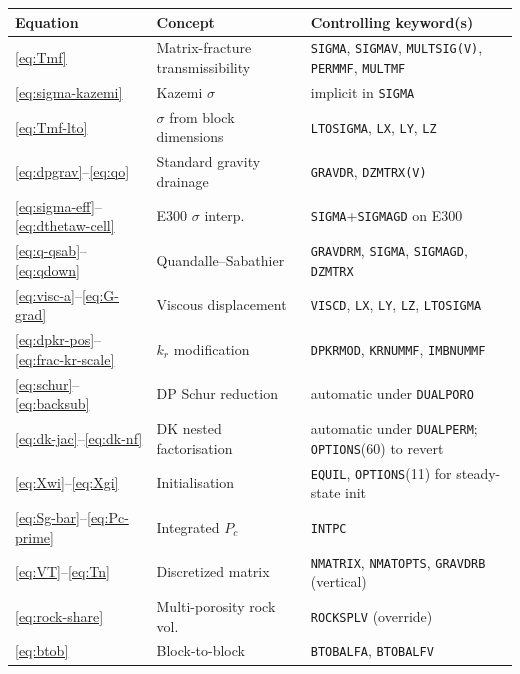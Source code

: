 \documentclass[11pt,a4paper]{article}
\newcommand{\kw}[1]{\texttt{#1}}
\begin{document}
\begin{center}\small
\begin{tabular}{lll}
\toprule
Equation & Concept & Controlling keyword(s) \\
\midrule
\eqref{eq:Tmf}            & Matrix-fracture transmissibility            & \kw{SIGMA}, \kw{SIGMAV}, \kw{MULTSIG(V)}, \kw{PERMMF}, \kw{MULTMF}  \\
\eqref{eq:sigma-kazemi}   & Kazemi $\sigma$                              & implicit in \kw{SIGMA}                 \\
\eqref{eq:Tmf-lto}        & $\sigma$ from block dimensions               & \kw{LTOSIGMA}, \kw{LX}, \kw{LY}, \kw{LZ} \\
\eqref{eq:dpgrav}--\eqref{eq:qo} & Standard gravity drainage          & \kw{GRAVDR}, \kw{DZMTRX(V)}              \\
\eqref{eq:sigma-eff}--\eqref{eq:dthetaw-cell} & E300 $\sigma$ interp.   & \kw{SIGMA}+\kw{SIGMAGD} on E300         \\
\eqref{eq:q-qsab}--\eqref{eq:qdown}           & Quandalle--Sabathier   & \kw{GRAVDRM}, \kw{SIGMA}, \kw{SIGMAGD}, \kw{DZMTRX} \\
\eqref{eq:visc-a}--\eqref{eq:G-grad}          & Viscous displacement   & \kw{VISCD}, \kw{LX}, \kw{LY}, \kw{LZ}, \kw{LTOSIGMA} \\
\eqref{eq:dpkr-pos}--\eqref{eq:frac-kr-scale} & $k_r$ modification     & \kw{DPKRMOD}, \kw{KRNUMMF}, \kw{IMBNUMMF}\\
\eqref{eq:schur}--\eqref{eq:backsub}          & DP Schur reduction     & automatic under \kw{DUALPORO}            \\
\eqref{eq:dk-jac}--\eqref{eq:dk-nf}           & DK nested factorisation & automatic under \kw{DUALPERM}; \kw{OPTIONS}(60) to revert \\
\eqref{eq:Xwi}--\eqref{eq:Xgi}                & Initialisation         & \kw{EQUIL}, \kw{OPTIONS}(11) for steady-state init \\
\eqref{eq:Sg-bar}--\eqref{eq:Pc-prime}        & Integrated $P_c$        & \kw{INTPC}                               \\
\eqref{eq:VT}--\eqref{eq:Tn}                  & Discretized matrix      & \kw{NMATRIX}, \kw{NMATOPTS}, \kw{GRAVDRB} (vertical) \\
\eqref{eq:rock-share}                          & Multi-porosity rock vol. & \kw{ROCKSPLV} (override)                \\
\eqref{eq:btob}                                & Block-to-block          & \kw{BTOBALFA}, \kw{BTOBALFV}             \\
\bottomrule
\end{tabular}
\end{center}
\end{document}
